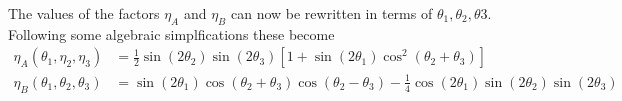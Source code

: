 \documentclass[reqno]{amsart}
\numberwithin{lemma}{section}
\numberwithin{proposition}{section}
\begin{document}
The values of the factors $\eta_{A}$ and $\eta_{B}$ can now be rewritten in terms of $\theta_{1}, \theta_{2}, \theta{3}$. Following some algebraic simplfications these become
\begin{align*}
	\eta_{A}(\theta_{1}, \eta_{2}, \eta_{3}) &= \frac{1}{2} \sin(2 \theta_{2}) \sin(2\theta_{3}) \left [ 1 + \sin(2 \theta_{1}) \cos^{2}(\theta_{2} + \theta_{3}) \right ]\\
	\eta_{B}(\theta_{1}, \theta_{2}, \theta_{3}) &= \sin(2 \theta_{1}) \cos(\theta_{2} + \theta_{3}) \cos(\theta_{2} - \theta_{3}) - \frac{1}{4} \cos(2\theta_{1}) \sin(2\theta_{2}) \sin(2\theta_{3})
\end{align*}
{}
\end{document}
